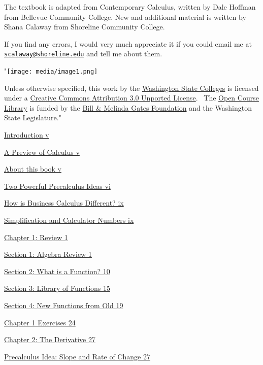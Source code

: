 The textbook is adapted from Contemporary Calculus, written by Dale
Hoffman from Bellevue Community College. New and additional material is
written by Shana Calaway from Shoreline Community College.

If you find any errors, I would very much appreciate it if you could
email me at
\href{mailto:scalaway@shoreline.edu}{\nolinkurl{scalaway@shoreline.edu}}
and tell me about them.

"\texttt{[image: media/image1.png]}

Unless otherwise specified, this work by the
\href{http://sbctc.edu/}{Washington State Colleges} is licensed under a
\href{http://creativecommons.org/licenses/by/3.0/}{Creative Commons
Attribution 3.0 Unported License}. ~The
\href{http://opencourselibrary.org/}{Open Course Library} is funded by
the
\href{http://www.gatesfoundation.org/postsecondaryeducation/Pages/default.aspx}{Bill
\& Melinda Gates Foundation} and the Washington State Legislature."~

\protect\hyperlink{_Toc350590202}{Introduction v}

\protect\hyperlink{a-preview-of-calculus}{A Preview of Calculus v}

\protect\hyperlink{about-this-book}{About this book v}

\protect\hyperlink{two-powerful-precalculus-ideas}{Two Powerful
Precalculus Ideas vi}

\protect\hyperlink{how-is-business-calculus-different}{How is Business
Calculus Different? ix}

\protect\hyperlink{simplification-and-calculator-numbers}{Simplification
and Calculator Numbers ix}

\protect\hyperlink{section}{Chapter 1: Review 1}

\protect\hyperlink{section-1-algebra-review}{Section 1: Algebra Review
1}

\protect\hyperlink{section-2-what-is-a-function}{Section 2: What is a
Function? 10}

\protect\hyperlink{section-3-library-of-functions}{Section 3: Library of
Functions 15}

\protect\hyperlink{section-4-new-functions-from-old}{Section 4: New
Functions from Old 19}

\protect\hyperlink{chapter-1-exercises}{Chapter 1 Exercises 24}

\protect\hyperlink{chapter-2-the-derivative}{Chapter 2: The Derivative
27}

\protect\hyperlink{precalculus-idea-slope-and-rate-of-change}{Precalculus
Idea: Slope and Rate of Change 27}

